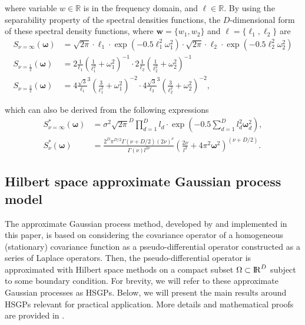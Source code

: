 \documentclass[]{interact}
\theoremstyle{plain}%
\theoremstyle{definition}
\theoremstyle{remark}
\begin{document}
\noindent where variable $w\in \mathbb{R}$ is in the frequency domain, and $\ell\in \mathbb{R}$. By using the separability property of the spectral densities functions, the $D$-dimensional form of these spectral density functions, where $\mathbf{w}=\{w_1,w_2\}$ and $\mathbf{\ell}=\{\ell_1,\ell_2\}$ are
%
\begin{align}
S_{\nu=\infty}(\bm{\omega})&= \sqrt{2\pi} \cdot \ell_1 \cdot \exp\left(-0.5 \ell_1^2 \omega_1^2\right) \cdot  \sqrt{2\pi} \cdot \ell_2 \cdot \exp\left(-0.5 \ell_2^2 \omega_2^2\right) \label{eq:specdens_multi_inf} \\
S_{\nu=\frac{1}{2}}(\bm{\omega})&= 2 \frac{1}{\ell_1}\left(\frac{1}{\ell_1^2} + \omega_1^2\right)^{-1} \cdot 2 \frac{1}{\ell_2}\left(\frac{1}{\ell_2^2} + \omega_2^2\right)^{-1} \label{eq:specdens_multi_12} \\
S_{\nu=\frac{3}{2}}(\bm{\omega})&= 4 \frac{\sqrt{3}}{\ell_1}^{3}\left(\frac{3}{\ell_1^2} + \omega_1^2\right)^{-2} \cdot 4 \frac{\sqrt{3}}{\ell_2}^{3}\left(\frac{3}{\ell_2^2} + \omega_2^2\right)^{-2}, \label{eq:specdens_multi_32}
\end{align}

\noindent which can also be derived from the following expressions \citep{rasmussen2006gaussian}
%
\begin{align*}
S^{\ast}_{\nu=\infty}(\mathbf{\omega})&= \sigma^2 \sqrt{2\pi}^D \prod_{d=1}^D l_d \cdot \exp\left(-0.5 \sum_{d=1}^D l_d^2 \mathbf{\omega}_d^2\right), \\
%
S^{\ast}_{\nu}(\mathbf{\omega})&= \frac{2^D\pi^{D/2}\Gamma(\nu+D/2)(2\nu)^{\nu}}{\Gamma(\nu)l^{2\nu}}\left(\frac{2\nu}{l^2}+4\pi^2\mathbf{\omega}^2 \right)^{(\nu+D/2)}.
\end{align*}

\subsection{Hilbert space approximate Gaussian process model}

The approximate Gaussian process method, developed by \cite{solin2018hilbert} and implemented in this paper, is based on considering the covariance operator of a homogeneous (stationary) covariance function as a pseudo-differential operator constructed as a series of Laplace operators. Then, the pseudo-differential operator is approximated with Hilbert space methods on a compact subset $\Omega \subset {\rm I\!R}^D$ subject to some boundary condition. For brevity, we will refer to these approximate Gaussian processes as HSGPs. Below, we will present the main results around HSGPs relevant for practical application. More details and mathematical proofs are provided in \cite{solin2018hilbert}.
\end{document}
